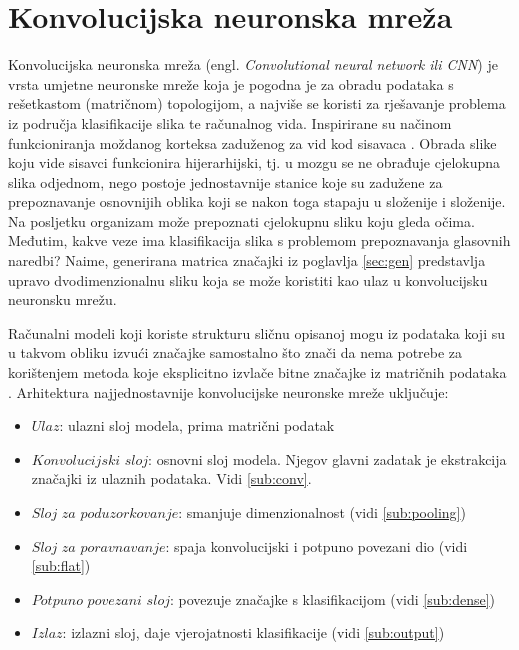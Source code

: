 \section{Konvolucijska neuronska mreža}
\label{sec:cnn}

Konvolucijska neuronska mreža (engl. \textit{Convolutional neural network ili CNN}) je vrsta 
umjetne neuronske mreže koja je pogodna je za obradu podataka s rešetkastom (matričnom)
topologijom, a najviše se koristi za rješavanje problema iz područja klasifikacije slika
te računalnog vida. Inspirirane su načinom funkcioniranja moždanog korteksa 
zaduženog za vid kod sisavaca \cite{pycodemates}. Obrada slike koju vide sisavci
funkcionira hijerarhijski, tj. u mozgu se ne obrađuje cjelokupna slika odjednom,
nego postoje jednostavnije stanice koje su zadužene za prepoznavanje osnovnijih
oblika koji se nakon toga stapaju u složenije i složenije. Na posljetku 
organizam može prepoznati cjelokupnu sliku koju gleda očima.
Međutim, kakve veze ima klasifikacija slika s problemom prepoznavanja glasovnih naredbi?
Naime, generirana matrica značajki iz poglavlja \ref{sec:gen} predstavlja upravo dvodimenzionalnu
sliku koja se može koristiti kao ulaz u konvolucijsku neuronsku mrežu.

Računalni modeli koji koriste strukturu sličnu opisanoj mogu iz
podataka koji su u takvom obliku izvući značajke samostalno što znači da nema
potrebe za korištenjem metoda koje eksplicitno izvlače bitne značajke iz matričnih podataka
\cite{1}. Arhitektura najjednostavnije konvolucijske neuronske mreže
uključuje:

\begin{itemize}
    \item \(Ulaz\): ulazni sloj modela, prima matrični podatak
    \item \(Konvolucijski\) \(sloj\): osnovni sloj modela. Njegov glavni zadatak
          je ekstrakcija značajki iz ulaznih podataka. Vidi \ref{sub:conv}.
    \item \(Sloj\) \(za\) \(poduzorkovanje\): smanjuje dimenzionalnost (vidi \ref{sub:pooling})
    \item \(Sloj\) \(za\) \(poravnavanje\): spaja konvolucijski i potpuno povezani dio (vidi \ref{sub:flat})
    \item \(Potpuno\) \(povezani\) \(sloj\): povezuje značajke s klasifikacijom (vidi \ref{sub:dense})
    \item \(Izlaz\): izlazni sloj, daje vjerojatnosti klasifikacije (vidi \ref{sub:output})
\end{itemize}

